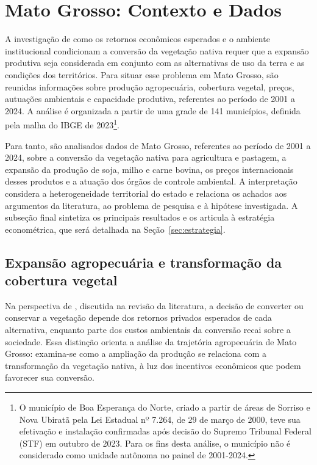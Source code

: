 \section{Mato Grosso: Contexto e Dados}
\label{sec:dados}

\begingroup


A investigação de como os retornos econômicos esperados e o ambiente institucional condicionam a conversão da vegetação nativa requer que a expansão produtiva seja considerada em conjunto com as alternativas de uso da terra e as condições dos territórios. Para situar esse problema em Mato Grosso, são reunidas informações sobre produção agropecuária, cobertura vegetal, preços, autuações ambientais e capacidade produtiva, referentes ao período de 2001 a 2024. A análise é organizada a partir de uma grade de 141 municípios, definida pela malha do IBGE de 2023\footnote{O município de Boa Esperança do Norte, criado a partir de áreas de Sorriso e Nova Ubiratã pela Lei Estadual nº 7.264, de 29 de março de 2000, teve sua efetivação e instalação confirmadas após decisão do Supremo Tribunal Federal (STF) em outubro de 2023. Para os fins desta análise, o município não é considerado como unidade autônoma no painel de 2001-2024.}.

Para tanto, são analisados dados de Mato Grosso, referentes ao período de 2001 a 2024, sobre a conversão da vegetação nativa para agricultura e pastagem, a expansão da produção de soja, milho e carne bovina, os preços internacionais desses produtos e a atuação dos órgãos de controle ambiental. A interpretação considera a heterogeneidade territorial do estado e relaciona os achados aos argumentos da literatura, ao problema de pesquisa e à hipótese investigada. A subseção final sintetiza os principais resultados e os articula à estratégia econométrica, que será detalhada na Seção~\ref{sec:estrategia}.

\subsection{Expansão agropecuária e transformação da cobertura vegetal}
\label{subsec:mt-expansao}

Na perspectiva de , discutida na revisão da literatura, a decisão de converter ou conservar a vegetação depende dos retornos privados esperados de cada alternativa, enquanto parte dos custos ambientais da conversão recai sobre a sociedade. Essa distinção orienta a análise da trajetória agropecuária de Mato Grosso: examina-se como a ampliação da produção se relaciona com a transformação da vegetação nativa, à luz dos incentivos econômicos que podem favorecer sua conversão.

